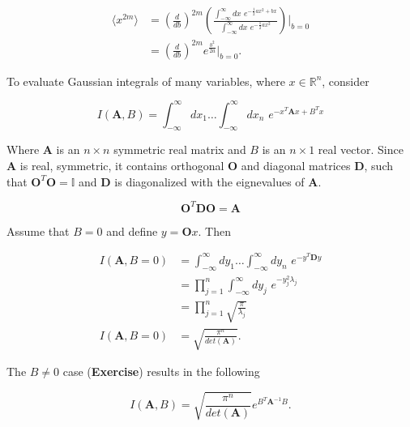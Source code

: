 \begin{align}
\langle x^{2m} \rangle &=  \left( \frac{d}{db} \right)^{2m} \left(  \frac{\int_{-\infty}^\infty dx \,\, e^{ -\frac{1}{2} a x^2 + b x }}{\int_{-\infty}^\infty dx \,\, e^{ -\frac{1}{2} a x^2 }} \right) \big|_{b=0} \\
&= \left( \frac{d}{db} \right)^{2m} e^{\frac{b^2}{2a}} \big|_{b=0}.
\end{align}

\noindent To evaluate Gaussian integrals of many variables, where $x \in \mathbb{R}^n$, consider

\begin{equation}
I(\textbf{A}, B) = \int_{-\infty}^\infty dx_1 \dots \int_{-\infty}^\infty dx_n \,\, e^{-x^T \textbf{A} x + B^T x}
\end{equation}

\noindent Where $\textbf{A}$ is an $n \times n$ symmetric real matrix and $B$ is an $n \times 1$ real vector. Since $\textbf{A}$ is real, symmetric, it contains orthogonal $\textbf{O}$ and diagonal matrices $\textbf{D}$, such that $\textbf{O}^T \textbf{O} = \mathbb{I}$ and $\textbf{D}$ is diagonalized with the eignevalues of $\textbf{A}$.

\begin{equation}
\textbf{O}^T \textbf{D} \textbf{O} = \textbf{A}
\end{equation}

\noindent Assume that $B=0$ and define $y = \textbf{O} x$. Then

\begin{align}
I(\textbf{A}, B=0) &= \int_{-\infty}^\infty dy_1 \dots \int_{-\infty}^\infty dy_n \,\, e^{-y^T \textbf{D} y} \\
&= \prod_{j=1}^n \int_{-\infty}^\infty dy_j \,\, e^{-y_j^2 \lambda_j} \\
&= \prod_{j=1}^n \sqrt{\frac{\pi}{\lambda_j}} \\
I(\textbf{A}, B=0)&= \sqrt{\frac{\pi^n}{det(\textbf{A})}}.
\end{align}

\noindent The $B \ne 0$ case (\textbf{Exercise}) results in the following

\begin{equation}
I(\textbf{A},B) = \sqrt{\frac{\pi^n}{det(\textbf{A})}} e^{B^T \textbf{A}^{-1} B}.
\end{equation}